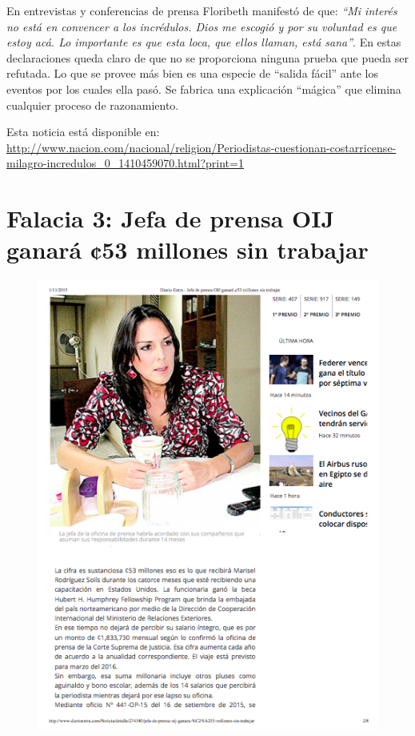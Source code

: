 \documentclass[times]{simauth}
\begin{document}
En entrevistas y conferencias de prensa Floribeth manifestó de que: \textit{``Mi interés no está en convencer a los incrédulos. Dios me escogió y por su voluntad es que estoy acá. Lo importante es que esta loca, que ellos llaman, está sana''}. En estas declaraciones queda claro de que no se proporciona ninguna prueba que pueda ser refutada. Lo que se provee más bien es una especie de ``salida fácil'' ante los eventos por los cuales ella pasó. Se fabrica una explicación ``mágica'' que elimina cualquier proceso de razonamiento.

Esta noticia está disponible en:  \href{http://www.nacion.com/nacional/religion/Periodistas-cuestionan-costarricense-milagro-incredulos_0_1410459070.html?print=1}{http://www.nacion.com/nacional/religion/Periodistas-cuestionan-costarricense-milagro-incredulos\_0\_1410459070.html?print=1}

\newpage
\section{Falacia 3: Jefa de prensa OIJ ganará ¢53 millones sin trabajar}

\begin{figure}[h!]
    \centering
    \includegraphics[width=15cm]{noticiaJefaOIJ}
    \label{fig:falacia3}
\end{figure}
\end{document}
